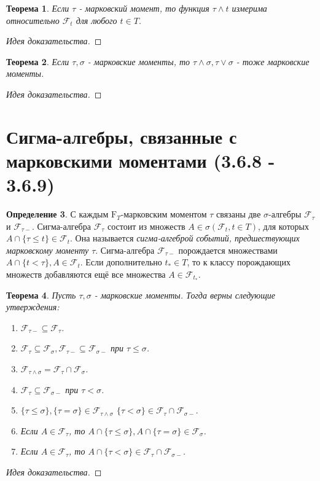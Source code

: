 \documentclass[16pt]{article}
\newtheorem{theorem}{Теорема}[section]
\theoremstyle{definition}
\newtheorem{definition}[theorem]{Определение}
\begin{document}
\begin{theorem}
Если $\tau$ - марковский момент, то функция $\tau \wedge t$ измерима относительно $\mathcal{F}_t$ для любого $t \in T$.
\end{theorem}
\begin{proof}[Идея доказательства]

\end{proof}
\begin{theorem}
Если $\tau, \sigma$ - марковские моменты, то $\tau \wedge \sigma, \tau \vee \sigma$ - тоже марковские моменты.
\end{theorem}
\begin{proof}[Идея доказательства]

\end{proof}

\section{Сигма-алгебры, связанные с марковскими моментами (3.6.8 - 3.6.9)}
\begin{definition}
С каждым $\mathrm{F}_T$-марковским моментом $\tau$ связаны две $\sigma$-алгебры $\mathcal{F}_\tau$ и $\mathcal{F}_{\tau-}$. \newline
Сигма-алгебра $\mathcal{F}_\tau$ состоит из множеств $A \in \sigma(\mathcal{F}_t, t \in T)$, для которых $A \cap \{\tau \le t\} \in \mathcal{F}_t$. Она называется \textit{сигма-алгеброй событий, предшествующих марковскому моменту $\tau$}. \newline
Сигма-алгебра $\mathcal{F}_{\tau-}$ порождается множествами $A \cap \{t < \tau\}, A \in \mathcal{F}_t$. Если дополнительно $t_* \in T$, то к классу порождающих множеств добавляются ещё все множества $A \in \mathcal{F}_{t_*}$.
\end{definition}
\begin{theorem}
Пусть $\tau, \sigma$ - марковские моменты. Тогда верны следующие утверждения:
\begin{enumerate}
    \item $\mathcal{F}_{\tau-} \subseteq \mathcal{F}_\tau$.
    \item $\mathcal{F}_{\tau} \subseteq \mathcal{F}_\sigma, \mathcal{F}_{\tau-} \subseteq \mathcal{F}_{\sigma-}$ при $\tau \le \sigma$.
    \item $\mathcal{F}_{\tau \wedge \sigma} = \mathcal{F}_\tau \cap \mathcal{F}_\sigma$.
    \item $\mathcal{F}_{\tau} \subseteq \mathcal{F}_{\sigma-}$ при $\tau < \sigma$.
    \item $\{\tau \le \sigma\}, \{\tau = \sigma\} \in \mathcal{F}_{\tau \wedge \sigma}$ \newline $\{\tau < \sigma\} \in \mathcal{F}_\tau \cap \mathcal{F}_{\sigma-}$.
    \item Если $A \in \mathcal{F}_\tau$, то $A \cap \{\tau \le \sigma\}, A \cap \{\tau = \sigma\} \in \mathcal{F}_\sigma$.
    \item Если $A \in \mathcal{F}_\tau$, то $A \cap \{\tau < \sigma\} \in \mathcal{F}_\tau \cap \mathcal{F}_{\sigma-}$.
\end{enumerate}
\end{theorem}
\begin{proof}[Идея доказательства]

\end{proof}
\end{document}
